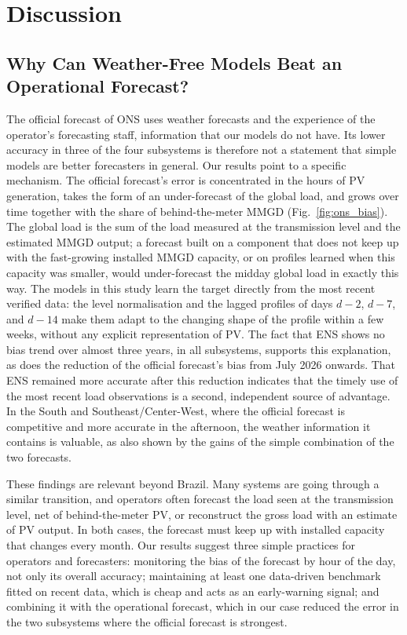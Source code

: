 \section{Discussion}
\label{sec:discussion}

\subsection{Why Can Weather-Free Models Beat an Operational Forecast?}
The official forecast of ONS uses weather forecasts and the experience of the operator's forecasting staff, information that our models do not have. Its lower accuracy in three of the four subsystems is therefore not a statement that simple models are better forecasters in general. Our results point to a specific mechanism. The official forecast's error is concentrated in the hours of PV generation, takes the form of an under-forecast of the global load, and grows over time together with the share of behind-the-meter MMGD (Fig.~\ref{fig:ons_bias}). The global load is the sum of the load measured at the transmission level and the estimated MMGD output; a forecast built on a component that does not keep up with the fast-growing installed MMGD capacity, or on profiles learned when this capacity was smaller, would under-forecast the midday global load in exactly this way. The models in this study learn the target directly from the most recent verified data: the level normalisation and the lagged profiles of days $d-2$, $d-7$, and $d-14$ make them adapt to the changing shape of the profile within a few weeks, without any explicit representation of PV. The fact that ENS shows no bias trend over almost three years, in all subsystems, supports this explanation, as does the reduction of the official forecast's bias from July 2026 onwards. That ENS remained more accurate after this reduction indicates that the timely use of the most recent load observations is a second, independent source of advantage. In the South and Southeast/Center-West, where the official forecast is competitive and more accurate in the afternoon, the weather information it contains is valuable, as also shown by the gains of the simple combination of the two forecasts.

These findings are relevant beyond Brazil. Many systems are going through a similar transition, and operators often forecast the load seen at the transmission level, net of behind-the-meter PV, or reconstruct the gross load with an estimate of PV output. In both cases, the forecast must keep up with installed capacity that changes every month. Our results suggest three simple practices for operators and forecasters: monitoring the bias of the forecast by hour of the day, not only its overall accuracy; maintaining at least one data-driven benchmark fitted on recent data, which is cheap and acts as an early-warning signal; and combining it with the operational forecast, which in our case reduced the error in the two subsystems where the official forecast is strongest.

